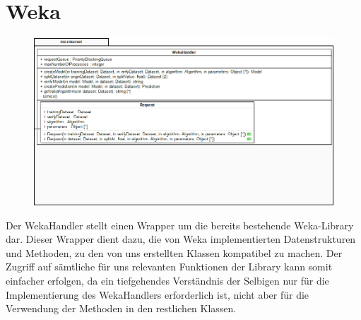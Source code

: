 \section{Weka}

\begin{figure}[h]
\centering
\includegraphics[width=1.0\linewidth]{Grafik/Klassendiagramme/Weka.png}
\end{figure}


Der WekaHandler stellt einen Wrapper um die bereits bestehende Weka-Library dar. Dieser Wrapper dient dazu, die von Weka implementierten Datenstrukturen und Methoden, zu den von uns erstellten Klassen kompatibel zu machen. Der Zugriff auf sämtliche für uns relevanten Funktionen der Library kann somit einfacher erfolgen, da ein tiefgehendes Verständnis der Selbigen nur für die Implementierung des WekaHandlers erforderlich ist, nicht aber für die Verwendung der Methoden in den restlichen Klassen.
